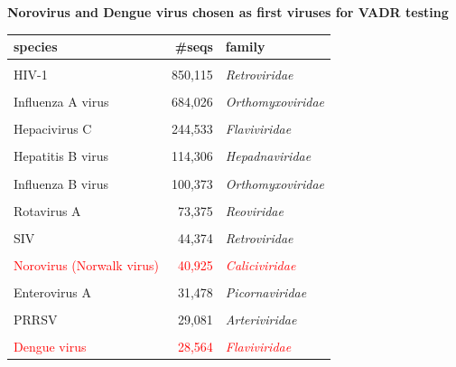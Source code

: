 \documentclass[landscape]{slides}
\begin{document}
\begin{slide}
\begin{center}

\textbf{Norovirus and Dengue virus chosen as first viruses for VADR testing}

\tiny
\begin{tabular}{lrl}
species                   &       \#seqs & family           \\ \hline
& & \\
HIV-1                     &      850,115 & \emph{Retroviridae}     \\ %
& & \\
Influenza A virus         &      684,026 & \emph{Orthomyxoviridae} \\ %
& & \\
Hepacivirus C             &      244,533 & \emph{Flaviviridae}     \\ %
& & \\
Hepatitis B virus         &      114,306 & \emph{Hepadnaviridae}   \\ %
& & \\
Influenza B virus         &      100,373 & \emph{Orthomyxoviridae} \\ %
& & \\
Rotavirus A               &       73,375 & \emph{Reoviridae}       \\ %
& & \\
SIV                       &       44,374 & \emph{Retroviridae}     \\ %
& & \\
\textcolor{red}{Norovirus (Norwalk virus)} &       \textcolor{red}{40,925} & \textcolor{red}{\emph{Caliciviridae}}    \\ %
& & \\
Enterovirus A             &       31,478 & \emph{Picornaviridae}   \\ %
& & \\
PRRSV                     &       29,081 & \emph{Arteriviridae}    \\ %
& & \\
\textcolor{red}{Dengue virus}              &       \textcolor{red}{28,564} & \textcolor{red}{\emph{Flaviviridae}}     \\ %

\end{tabular}
\end{center}
\end{slide}
\end{document}
